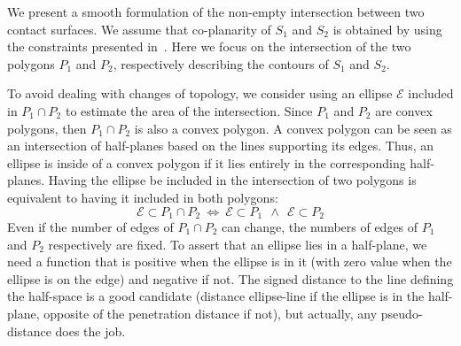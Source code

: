 We present a smooth formulation of the non-empty intersection between two contact surfaces.
We assume that co-planarity of $S_1$ and $S_2$ is obtained by using the constraints presented in~.
Here we focus on the intersection of the two polygons $P_1$ and $P_2$, respectively describing the contours of $S_1$ and $S_2$.

To avoid dealing with changes of topology, we consider using an ellipse $\mathcal{E}$ included in $P_1 \cap P_2$ to estimate the area of the intersection.
Since $P_1$ and $P_2$ are convex polygons, then $P_1 \cap P_2$ is also a convex polygon.
A convex polygon can be seen as an intersection of half-planes based on the lines supporting its edges.
Thus, an ellipse is inside of a convex polygon if it lies entirely in the corresponding half-planes.
Having the ellipse be included in the intersection of two polygons is equivalent to having it included in both polygons:
\begin{equation}
\mathcal{E} \subset P_1 \cap P_2 \ \Longleftrightarrow \
\mathcal{E} \subset P_1 \ \ \wedge \ \  \mathcal{E} \subset P_2
\end{equation}
Even if the number of edges of $P_1 \cap P_2$ can change, the numbers of edges of $P_1$ and $P_2$ respectively are fixed.
To assert that an ellipse lies in a half-plane, we need a function that is positive when the ellipse is in it (with zero value when the ellipse is on the edge) and negative if not.
The signed distance to the line defining the half-space is a good candidate (distance ellipse-line if the ellipse is in the half-plane, opposite of the penetration distance if not), but actually, any pseudo-distance does the job.

